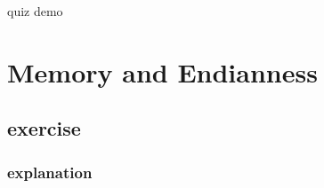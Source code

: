 \begin{frame}{quiz demo}
\end{frame}

\section{Memory and Endianness}



\subsection{exercise}

\subsubsection{explanation}


